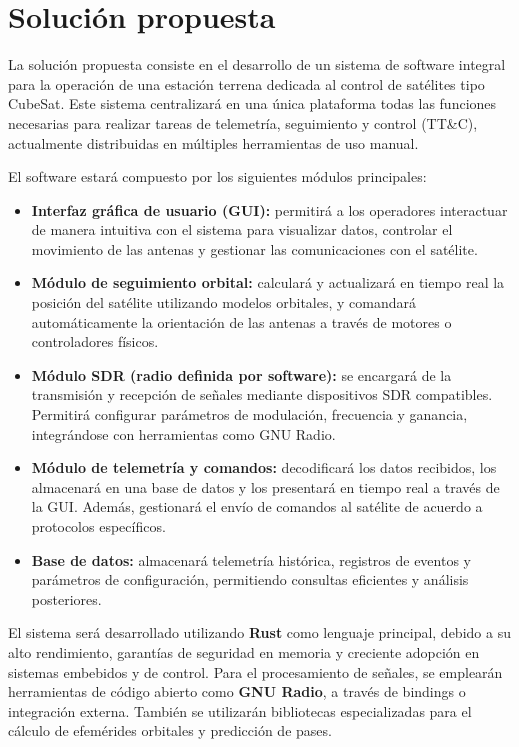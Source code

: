 \section*{Solución propuesta}

La solución propuesta consiste en el desarrollo de un sistema de software integral para la operación de una estación terrena dedicada al control de satélites tipo CubeSat. Este sistema centralizará en una única plataforma todas las funciones necesarias para realizar tareas de telemetría, seguimiento y control (TT\&C), actualmente distribuidas en múltiples herramientas de uso manual.

El software estará compuesto por los siguientes módulos principales:

\begin{itemize}
    \item \textbf{Interfaz gráfica de usuario (GUI):} permitirá a los operadores interactuar de manera intuitiva con el sistema para visualizar datos, controlar el movimiento de las antenas y gestionar las comunicaciones con el satélite.
    
    \item \textbf{Módulo de seguimiento orbital:} calculará y actualizará en tiempo real la posición del satélite utilizando modelos orbitales, y comandará automáticamente la orientación de las antenas a través de motores o controladores físicos.
    
    \item \textbf{Módulo SDR (radio definida por software):} se encargará de la transmisión y recepción de señales mediante dispositivos SDR compatibles. Permitirá configurar parámetros de modulación, frecuencia y ganancia, integrándose con herramientas como GNU Radio.
    
    \item \textbf{Módulo de telemetría y comandos:} decodificará los datos recibidos, los almacenará en una base de datos y los presentará en tiempo real a través de la GUI. Además, gestionará el envío de comandos al satélite de acuerdo a protocolos específicos.
    
    \item \textbf{Base de datos:} almacenará telemetría histórica, registros de eventos y parámetros de configuración, permitiendo consultas eficientes y análisis posteriores.
\end{itemize}

El sistema será desarrollado utilizando \textbf{Rust} como lenguaje principal, debido a su alto rendimiento, garantías de seguridad en memoria y creciente adopción en sistemas embebidos y de control. Para el procesamiento de señales, se emplearán herramientas de código abierto como \textbf{GNU Radio}, a través de bindings o integración externa. También se utilizarán bibliotecas especializadas para el cálculo de efemérides orbitales y predicción de pases.

